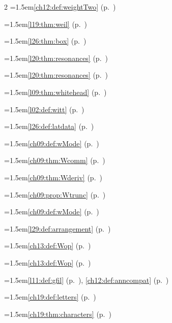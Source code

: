 \begin{multicols}{2}
\hangindent=1.5em\quad \ref{ch12:def:weightTwo} (p.~\pageref{ch12:def:weightTwo})\par
\hangindent=1.5em\quad \ref{l19:thm:weil} (p.~\pageref{l19:thm:weil})\par
\hangindent=1.5em\quad \ref{l26:thm:box} (p.~\pageref{l26:thm:box})\par
\hangindent=1.5em\quad \ref{l20:thm:resonances} (p.~\pageref{l20:thm:resonances})\par
\hangindent=1.5em\quad \ref{l20:thm:resonances} (p.~\pageref{l20:thm:resonances})\par
\hangindent=1.5em\quad \ref{l09:thm:whitehead} (p.~\pageref{l09:thm:whitehead})\par
\hangindent=1.5em\quad \ref{l02:def:witt} (p.~\pageref{l02:def:witt})\par
\hangindent=1.5em\quad \ref{l26:def:latdata} (p.~\pageref{l26:def:latdata})\par
\hangindent=1.5em\quad \ref{ch09:def:wMode} (p.~\pageref{ch09:def:wMode})\par
\hangindent=1.5em\quad \ref{ch09:thm:Wcomm} (p.~\pageref{ch09:thm:Wcomm})\par
\hangindent=1.5em\quad \ref{ch09:thm:Wderiv} (p.~\pageref{ch09:thm:Wderiv})\par
\hangindent=1.5em\quad \ref{ch09:prop:Wtrunc} (p.~\pageref{ch09:prop:Wtrunc})\par
\hangindent=1.5em\quad \ref{ch09:def:wMode} (p.~\pageref{ch09:def:wMode})\par
\hangindent=1.5em\quad \ref{l29:def:arrangement} (p.~\pageref{l29:def:arrangement})\par
\hangindent=1.5em\quad \ref{ch13:def:Wop} (p.~\pageref{ch13:def:Wop})\par
\hangindent=1.5em\quad \ref{ch13:def:Wop} (p.~\pageref{ch13:def:Wop})\par
\hangindent=1.5em\quad \ref{l11:def:gfil} (p.~\pageref{l11:def:gfil}), \ref{ch12:def:anncompat} (p.~\pageref{ch12:def:anncompat})\par
\hangindent=1.5em\quad \ref{ch19:def:letters} (p.~\pageref{ch19:def:letters})\par
\hangindent=1.5em\quad \ref{ch19:thm:characters} (p.~\pageref{ch19:thm:characters})\par

\end{multicols}
